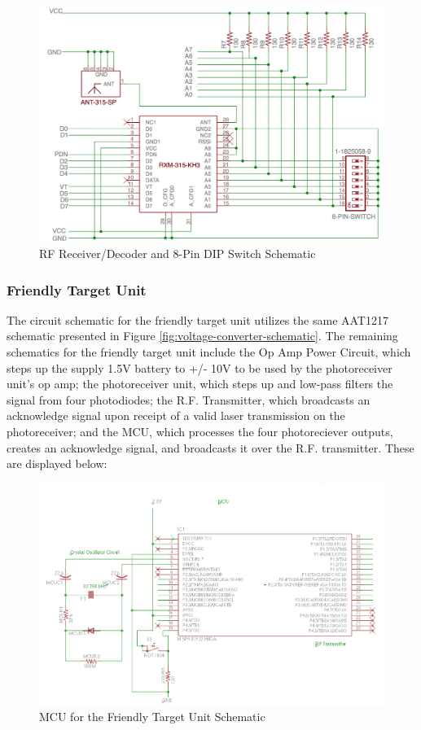 \documentclass[letterpaper,10pt]{article}
\begin{document}
\begin{spacing}{1.15}
\begin{figure} [H]
	\centering
	\includegraphics[scale=0.5]{RF_Receiver_Decoder_Schematic.png}
	\caption{RF Receiver/Decoder and 8-Pin DIP Switch Schematic\label{fig:rf-receiver-decoder-schematic}}
\end{figure}


\subsubsection{Friendly Target Unit}
The circuit schematic for the friendly target unit utilizes the same AAT1217 schematic presented in Figure \ref{fig:voltage-converter-schematic}. The remaining schematics for the friendly target unit include the Op Amp Power Circuit, which steps up the supply 1.5V battery to +/- 10V to be used by the photoreceiver unit's op amp; the photoreceiver unit, which steps up and low-pass filters the signal from four photodiodes; the R.F. Transmitter, which broadcasts an acknowledge signal upon receipt of a valid laser transmission on the photoreceiver; and the MCU, which processes the four photoreciever outputs, creates an acknowledge signal, and broadcasts it over the R.F. transmitter. These are displayed below:

\begin{figure} [H]
	\centering
	\includegraphics[scale=0.5]{MCU-Target.png}
	\caption{MCU for the Friendly Target Unit  Schematic\label{fig:mcu-target-schematic}}
\end{figure}


\end{spacing}
\end{document}
